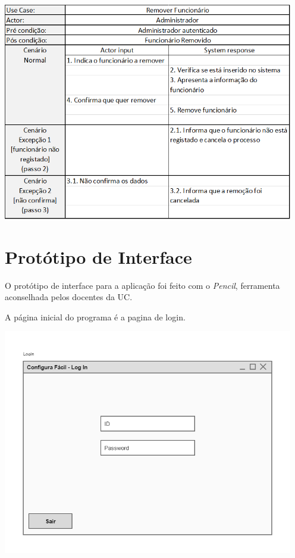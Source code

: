 \documentclass[11pt]{article} %
\begin{document}
\begin{enumerate}
\begin{center}
		\includegraphics[width = 5in]{gfunc_remover.png}
	\end{center}
\end{enumerate}

\section{Protótipo de Interface}
O protótipo de interface para a aplicação foi feito com o \textit{Pencil}, ferramenta aconselhada pelos docentes da UC.

A página inicial do programa é a pagina de login.
\begin{center}
 	\includegraphics[width = 5in]{configura_fcil_root.png}
\end{center}
\end{document}
